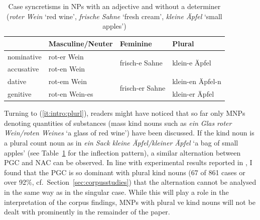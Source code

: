 \documentclass[USenglish]{article}
\begin{document}
\begin{table}
  \centering
  \begin{tabular}{llll}
     & Masculine\slash Neuter & Feminine & Plural \\
     \midrule
     nominative & rot-er Wein    & \multirow{2}{*}{frisch-e Sahne}   & \multirow{2}{*}{klein-e Äpfel} \\
     accusative & rot-en Wein    &                                   &                                \\
     dative     & rot-em Wein    & \multirow{2}{*}{frisch-er Sahne}  & klein-en Äpfel-n               \\
     genitive   & rot-en Wein-es &                                   & klein-er Äpfel                 \\
  \end{tabular}
  \caption{Case syncretisms in NPs with an adjective and without a determiner (\textit{roter Wein} `red wine', \textit{frische Sahne} `fresh cream', \textit{kleine Äpfel} `small apples')}
  \label{tab:syncretisms}
\end{table}

Turning to (\ref{it:intro:plurl}), readers might have noticed that so far only MNPs denoting quantities of substances (mass kind nouns such as \textit{ein Glas roter Wein\slash roten Weines} `a glass of red wine') have been discussed.
If the kind noun is a plural count noun as in \textit{ein Sack kleine Äpfel\slash kleiner Äpfel} `a bag of small apples' (see Table~\ref{tab:syncretisms} for the inflection pattern), a similar alternation between PGC and NAC can be observed.
In line with experimental results reported in \citet[15--16]{Zimmer2015}, I found that the PGC is so dominant with plural kind nouns (67 of 861 cases or over 92\%, cf.\ Section~\ref{sec:corpusstudies}) that the alternation cannot be analysed in the same way as in the singular case.
While this will play a role in the interpretation of the corpus findings, MNPs with plural ve kind nouns will not be dealt with prominently in the remainder of the paper.
\end{document}
